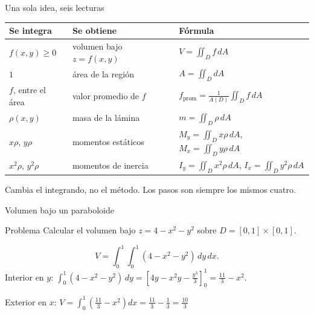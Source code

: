 \documentclass[11pt,aspectratio=169]{beamer}
\begin{document}
\begin{frame}{Una sola idea, seis lecturas}
  \begin{center}
  \renewcommand{\arraystretch}{1.5}
  \small
  \begin{tabular}{lll}
    \toprule
    \textbf{Se integra} & \textbf{Se obtiene} & \textbf{Fórmula}\\
    \midrule
    $f(x,y)\ge0$ & volumen bajo $z=f(x,y)$ & $V=\iint_D f\,dA$\\
    $1$ & área de la región & $A=\iint_D dA$\\
    $f$, entre el área & valor promedio de $f$ & $f_{\text{prom}}=\frac{1}{A(D)}\iint_D f\,dA$\\
    $\rho(x,y)$ & masa de la lámina & $m=\iint_D \rho\,dA$\\
    $x\rho$, $y\rho$ & momentos estáticos & $M_y=\iint_D x\rho\,dA$, $M_x=\iint_D y\rho\,dA$\\
    $x^2\rho$, $y^2\rho$ & momentos de inercia & $I_y=\iint_D x^2\rho\,dA$, $I_x=\iint_D y^2\rho\,dA$\\
    \bottomrule
  \end{tabular}
  \end{center}
  \vspace{8pt}
  \pause
  \begin{center}
  \normalsize\color{tealx} Cambia el integrando, no el método. Los pasos son siempre los mismos cuatro.
  \end{center}
\end{frame}

\begin{frame}{Volumen bajo un paraboloide}
  \begin{block}{Problema}
    Calcular el volumen bajo $z=4-x^2-y^2$ sobre $D=[0,1]\times[0,1]$.
  \end{block}
  \pause
  \[
    V=\int_0^1\!\!\int_0^1 (4-x^2-y^2)\,dy\,dx.
  \]
  \pause
  Interior en $y$:\quad
  $\displaystyle\int_0^1 (4-x^2-y^2)\,dy = \left[4y-x^2y-\frac{y^3}{3}\right]_0^1 = \frac{11}{3}-x^2$.
  \pause
  \vspace{4pt}

  Exterior en $x$:\quad
  $\displaystyle V=\int_0^1\left(\frac{11}{3}-x^2\right)dx = \frac{11}{3}-\frac13
  = \boxed{\frac{10}{3}}$
\end{frame}
\end{document}
